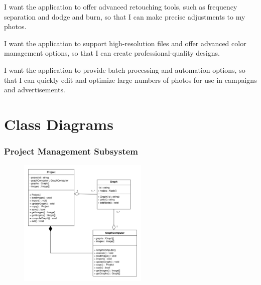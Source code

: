 \documentclass[11pt,a4paper]{article}
\begin{document}
I want the application to offer advanced retouching tools, such as frequency
separation and dodge and burn, so that I can make precise adjustments to my
photos.

I want the application to support high-resolution files and offer advanced color
management options, so that I can create professional-quality designs.

I want the application to provide batch processing and automation options, so
that I can quickly edit and optimize large numbers of photos for use in
campaigns and advertisements.

\pagebreak

\section*{Class Diagrams}

\subsubsection*{Project Management Subsystem}
\begin{figure}[htbp]
    \centering
    \href{https://drive.google.com/drive/u/2/folders/1rnYMSGTOmKY8_pOyJUIacjTxuubO_6NX}
    {\includegraphics[width=0.55\textwidth]{../diagramPng/Project-subsystem.png}}
\end{figure}

\end{document}

